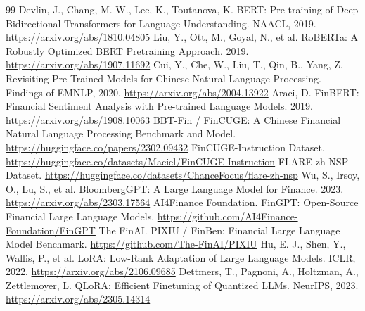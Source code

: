 \documentclass[UTF8,a4paper,12pt]{ctexart}
\begin{document}
\begin{thebibliography}{99}
 Devlin, J., Chang, M.-W., Lee, K., Toutanova, K. BERT: Pre-training of Deep Bidirectional Transformers for Language Understanding. NAACL, 2019. \url{https://arxiv.org/abs/1810.04805}
 Liu, Y., Ott, M., Goyal, N., et al. RoBERTa: A Robustly Optimized BERT Pretraining Approach. 2019. \url{https://arxiv.org/abs/1907.11692}
 Cui, Y., Che, W., Liu, T., Qin, B., Yang, Z. Revisiting Pre-Trained Models for Chinese Natural Language Processing. Findings of EMNLP, 2020. \url{https://arxiv.org/abs/2004.13922}
 Araci, D. FinBERT: Financial Sentiment Analysis with Pre-trained Language Models. 2019. \url{https://arxiv.org/abs/1908.10063}
 BBT-Fin / FinCUGE: A Chinese Financial Natural Language Processing Benchmark and Model. \url{https://huggingface.co/papers/2302.09432}
 FinCUGE-Instruction Dataset. \url{https://huggingface.co/datasets/Maciel/FinCUGE-Instruction}
 FLARE-zh-NSP Dataset. \url{https://huggingface.co/datasets/ChanceFocus/flare-zh-nsp}
 Wu, S., Irsoy, O., Lu, S., et al. BloombergGPT: A Large Language Model for Finance. 2023. \url{https://arxiv.org/abs/2303.17564}
 AI4Finance Foundation. FinGPT: Open-Source Financial Large Language Models. \url{https://github.com/AI4Finance-Foundation/FinGPT}
 The FinAI. PIXIU / FinBen: Financial Large Language Model Benchmark. \url{https://github.com/The-FinAI/PIXIU}
 Hu, E. J., Shen, Y., Wallis, P., et al. LoRA: Low-Rank Adaptation of Large Language Models. ICLR, 2022. \url{https://arxiv.org/abs/2106.09685}
 Dettmers, T., Pagnoni, A., Holtzman, A., Zettlemoyer, L. QLoRA: Efficient Finetuning of Quantized LLMs. NeurIPS, 2023. \url{https://arxiv.org/abs/2305.14314}
\end{thebibliography}
\end{document}
